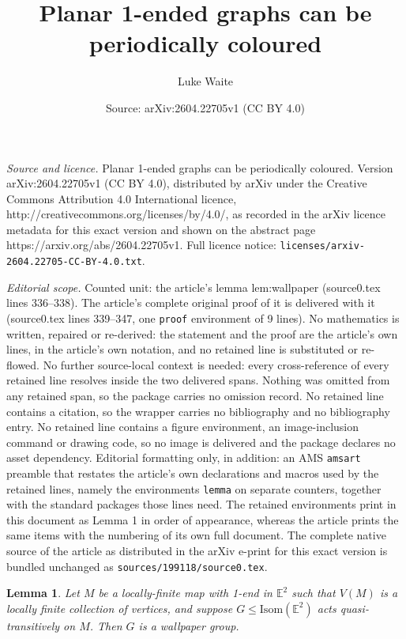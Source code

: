 \documentclass[10pt,a4paper]{amsart}
\title{Planar 1-ended graphs can be periodically coloured}
\author{Luke Waite}
\date{Source: arXiv:2604.22705v1 (CC BY 4.0)}
\newtheorem{lemma}{Lemma}
\newcommand{\EE}{\mathbb{E}}
\begin{document}
\maketitle

\noindent\emph{Source and licence.} Planar 1-ended graphs can be periodically coloured. Version arXiv:2604.22705v1 (CC BY 4.0), distributed by arXiv under the Creative Commons Attribution 4.0 International licence, http://creativecommons.org/licenses/by/4.0/, as recorded in the arXiv licence metadata for this exact version and shown on the abstract page https://arxiv.org/abs/2604.22705v1. Full licence notice: \texttt{licenses/arxiv-2604.22705-CC-BY-4.0.txt}.\par\smallskip

\noindent\textit{Editorial scope.} Counted unit: the article's lemma lem:wallpaper (source0.tex lines 336--338). The article's complete original proof of it is delivered with it (source0.tex lines 339--347, one \texttt{proof} environment of 9 lines). No mathematics is written, repaired or re-derived: the statement and the proof are the article's own lines, in the article's own notation, and no retained line is substituted or re-flowed.  No further source-local context is needed: every cross-reference of every retained line resolves inside the two delivered spans.  Nothing was omitted from any retained span, so the package carries no omission record.  No retained line contains a citation, so the wrapper carries no bibliography and no bibliography entry.  No retained line contains a figure environment, an image-inclusion command or drawing code, so no image is delivered and the package declares no asset dependency.  Editorial formatting only, in addition: an AMS \texttt{amsart} preamble that restates the article's own declarations and macros used by the retained lines, namely the environments \texttt{lemma} on separate counters, together with the standard packages those lines need.  The retained environments print in this document as Lemma 1 in order of appearance, whereas the article prints the same items with the numbering of its own full document.  The complete native source of the article as distributed in the arXiv e-print for this exact version is bundled unchanged as \texttt{sources/199118/source0.tex}.
\begin{lemma}\label{lem:wallpaper}
  Let $M$ be a locally-finite map with 1-end in $\EE^2$ such that $V(M)$ is a locally finite collection of vertices, and suppose $G\leq \text{Isom}(\EE^2)$ acts quasi-transitively on $M$. Then $G$ is a wallpaper group.
\end{lemma}
\end{document}

